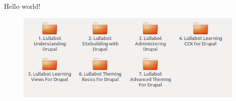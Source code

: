 \documentclass{article}
\begin{document}
Hello world!
\newpage
\begin{figure}[htbp]
  \centering

\includegraphics{drupal1.png}
\end{figure}
\end{document}
